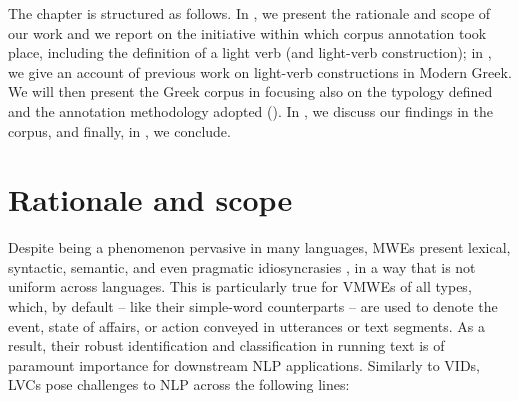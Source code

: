 \documentclass[output=paper,colorlinks,citecolor=brown]{langscibook}
\begin{document}
The chapter is structured as follows. In , we present the rationale and scope of our work and we report on the initiative within which corpus annotation took place, including the definition of a light verb (and light-verb construction); in , we give an account of previous work on light-verb constructions in Modern Greek. We will then present the Greek corpus in  focusing also on the typology defined and the annotation methodology adopted (). In  , we discuss our findings in the corpus, and finally, in , we conclude.




\section{Rationale and scope}
\label{sec:definitions-scope}
Despite being a phenomenon pervasive in many languages, MWEs present lexical, syntactic, semantic, and even pragmatic idiosyncrasies \citep{gross_1982, baldwin_kim_2010}, in a way that is not uniform across languages. This is particularly true for VMWEs of all types, which, by default -- like their simple-word counterparts -- are used to denote the event, state of affairs, or action conveyed in utterances or text segments. As a result, their robust identification and classification in running text is of paramount importance for downstream NLP applications.
Similarly to VIDs, LVCs pose challenges to NLP across the following lines:
\end{document}
